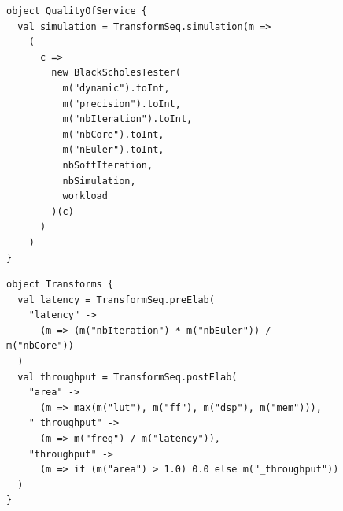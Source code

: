 \vspace{-0.4cm}
                \begin{figure}[h!]
                    \begin{lstlisting}[xleftmargin=0mm,
                                       basewidth={0.55em, 0.5em},
                                       caption={Defining an helper for empirical quality of service estimations},
                                       label={ch.expe:sec.strategies:ssec.bs:list.simu}]
object QualityOfService {
  val simulation = TransformSeq.simulation(m =>
    (                                                                       
      c =>                                                                                                        
        new BlackScholesTester(                                                                                   
          m("dynamic").toInt,                                                                                     
          m("precision").toInt,                                                                                   
          m("nbIteration").toInt,                                                                                 
          m("nbCore").toInt,                                                                                      
          m("nEuler").toInt,                                                         
          nbSoftIteration,                                                                                             
          nbSimulation,                                                                                                 
          workload                                                                                                
        )(c)                                                                                                      
      )                                                                                                           
    )                                                                                                            
}\end{lstlisting}
                \end{figure}
\vspace{-1.1cm}
                \begin{figure}[h!]
                    \begin{lstlisting}[xleftmargin=0mm,
                                       basewidth={0.55em,0.5em},
                                       caption={Transform helper for the exploration},
                                       label={ch.expe:sec.strategies:ssec.bs:list.transforms}]
object Transforms {
  val latency = TransformSeq.preElab(
    "latency" ->
      (m => (m("nbIteration") * m("nbEuler")) / m("nbCore"))
  )
  val throughput = TransformSeq.postElab(
    "area" ->
      (m => max(m("lut"), m("ff"), m("dsp"), m("mem"))),
    "_throughput" ->
      (m => m("freq") / m("latency")),
    "throughput" ->
      (m => if (m("area") > 1.0) 0.0 else m("_throughput"))
  )
}\end{lstlisting}
                \end{figure}

